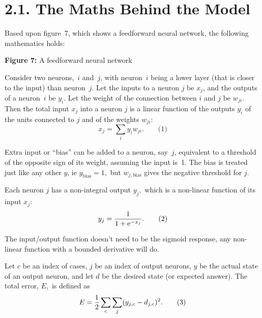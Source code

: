\documentclass[12pt]{report}
\begin{document}
\section{2.1. The Maths Behind the Model}

Based upon figure~7, which shows a feedforward neural network, the following 
mathematics holds:
\par\textbf{Figure 7:} A feedforward neural network

Consider two neurons,~$i$ and~$j$, with neuron~$i$ being a lower layer
(that is closer to the input) than neuron~$j$.
Let the inputs to a neuron $j$ be $x_j$, and the outputs of a neuron~$i$ 
be $y_i$.
Let the weight of the connection between $i$ and $j$ be $w_{ji}$.
Then the total input $x_j$ into a neuron $j$ is a linear function of the
outputs $y_i$ of the units connected to $j$ and of the weights $w_{ji}$:
$$ x_j = \sum_i y_i w_{ji}.\qquad\text{(1)} $$

Extra input or ``bias'' can be added to a neuron, say~$j$, equivalent to a
threshold of the opposite sign of its weight, assuming the input is~1.
The bias is treated just like any other $y$, ie $y_{\text{bias}} = 1,$
but $w_{j,\text{bias}}$ gives the negative threshold for $j$.

Each neuron $j$ has a non-integral output $y_j,$ which is a non-linear
function of its input $x_j:$
$$ y_j = {1 \over 1 + \text{e}^{-x_j}}.\qquad\text{(2)} $$

The input/output function doesn't need to be the sigmoid response, any
non-linear function with a bounded derivative will do.

Let $c$ be an index of cases, $j$ be an index of output neurons, 
$y$ be the actual state of
an output neuron, and let $d$ be the desired state (or expected answer).
The total error, $E,$ is defined as
$$
E = {1 \over 2} \sum_c \sum_j (y_{j,c} - d_{j,c})^2. \qquad\text{(3)}
$$
\end{document}
